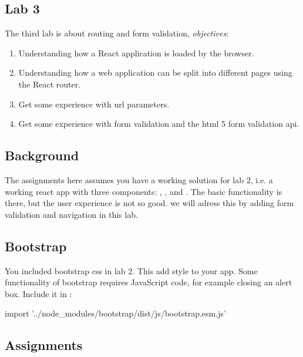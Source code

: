 \documentclass[fleqn, article, a4paper]{memoir}
\begin{document}
\maketitle
\thispagestyle{titlepage}
\vspace{-4cm}

\subsection*{Lab 3}

\n The third lab is about routing and form validation, \emph{objectives}:

\begin{enumerate}\firmlist
\item Understanding how a React application is loaded by the browser.
\item Understanding how a web application can be split into different pages using the React router.
\item Get some experience with url parameters.
\item Get some experience with form validation and the html 5 form validation api.
\end{enumerate}

\subsection*{Background}

The assignments here assumes you have a working solution for lab 2, i.e. a working react app with three components: , , and . The basic functionality is there, but the user experience is not so good. we will adress this by adding form validation and navigation in this lab.

\subsection*{Bootstrap}
You included bootstrap css in lab 2. This add style to your app. Some functionality of bootstrap requires JavaScript code, for example closing an alert box. Include it in :
\begin{Code}
import '../node_modules/bootstrap/dist/js/bootstrap.esm.js'
\end{Code}

\subsection*{Assignments}
\end{document}
